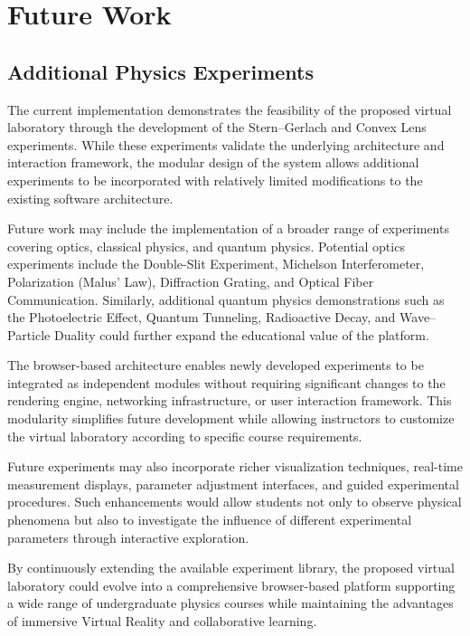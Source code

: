\chapter{Future Work}

\section{Additional Physics Experiments}

The current implementation demonstrates the feasibility of the proposed virtual laboratory through the development of the Stern--Gerlach and Convex Lens experiments. While these experiments validate the underlying architecture and interaction framework, the modular design of the system allows additional experiments to be incorporated with relatively limited modifications to the existing software architecture.

Future work may include the implementation of a broader range of experiments covering optics, classical physics, and quantum physics. Potential optics experiments include the Double-Slit Experiment, Michelson Interferometer, Polarization (Malus' Law), Diffraction Grating, and Optical Fiber Communication. Similarly, additional quantum physics demonstrations such as the Photoelectric Effect, Quantum Tunneling, Radioactive Decay, and Wave--Particle Duality could further expand the educational value of the platform.

The browser-based architecture enables newly developed experiments to be integrated as independent modules without requiring significant changes to the rendering engine, networking infrastructure, or user interaction framework. This modularity simplifies future development while allowing instructors to customize the virtual laboratory according to specific course requirements.

Future experiments may also incorporate richer visualization techniques, real-time measurement displays, parameter adjustment interfaces, and guided experimental procedures. Such enhancements would allow students not only to observe physical phenomena but also to investigate the influence of different experimental parameters through interactive exploration.

By continuously extending the available experiment library, the proposed virtual laboratory could evolve into a comprehensive browser-based platform supporting a wide range of undergraduate physics courses while maintaining the advantages of immersive Virtual Reality and collaborative learning.

